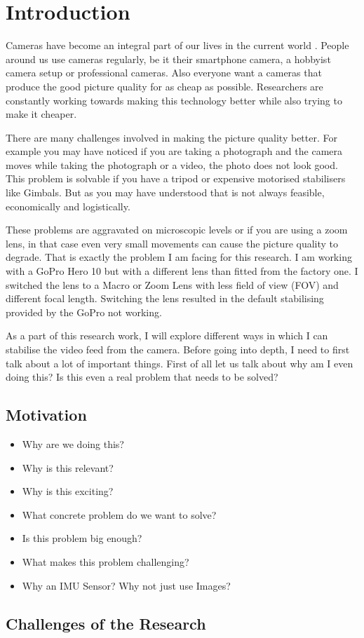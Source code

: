 \chapter{Introduction} \label{chapter_one}

Cameras have become an integral part of our lives in the current world  \citet{ibad2022}. People around us use cameras regularly, be it their smartphone camera, a hobbyist camera setup or professional cameras. Also everyone want a cameras that produce the good picture quality for as cheap as possible. Researchers are constantly working towards making this technology better while also trying to make it cheaper.

There are many challenges involved in making the picture quality better. For example you may have noticed if you are taking a photograph and the camera moves while taking the photograph or a video, the photo does not look good. This problem is solvable if you have a tripod or expensive motorised stabilisers like Gimbals. But as you may have understood that is not always feasible, economically and logistically.

These problems are aggravated on microscopic levels or if you are using a zoom lens, in that case even very small movements can cause the picture quality to degrade. That is exactly the problem I am facing for this research. I am working with a GoPro Hero 10 but with a different lens than fitted from the factory one. I switched the lens to a Macro or Zoom Lens with less field of view (FOV) and different focal length. Switching the lens resulted in the default stabilising provided by the GoPro not working.

As a part of this research work, I will explore different ways in which I can stabilise the video feed from the camera. Before going into depth, I need to first talk about a lot of important things. First of all let us talk about why am I even doing this? Is this even a real problem that needs to  be solved?

\section{Motivation}
\begin{itemize}
\item Why are we doing this?
\item Why is this relevant?
\item Why is this exciting?
\item What concrete problem do we want to solve?
\item Is this problem big enough?
\item What makes this problem challenging?
\item Why an IMU Sensor? Why not just use Images?
\end{itemize}

\section{Challenges of the Research}

